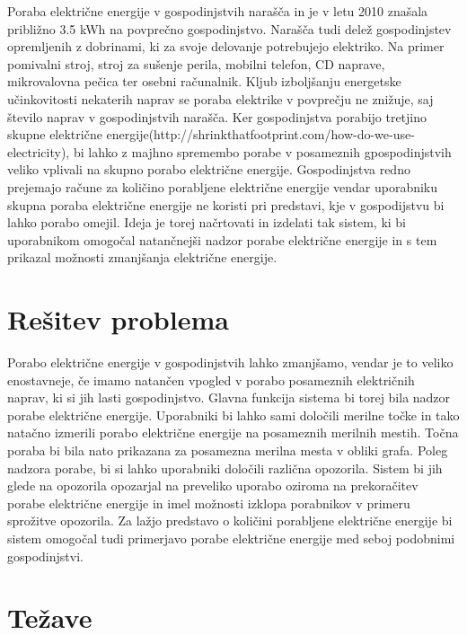 \documentclass[12pt,a4paper,titlepage,openany]{report}
\begin{document}
Poraba električne energije v gospodinjstvih narašča in je v letu 2010 znašala približno 3.5 kWh na povprečno gospodinjstvo. Narašča tudi delež gospodinjstev opremljenih z dobrinami, ki za svoje delovanje potrebujejo elektriko. Na primer pomivalni stroj, stroj za sušenje perila, mobilni telefon, CD naprave, mikrovalovna pečica ter osebni računalnik. Kljub izboljšanju energetske učinkovitosti nekaterih naprav se poraba elektrike v povprečju ne znižuje, saj število naprav v gospodinjstvih narašča. Ker gospodinjstva porabijo tretjino skupne električne energije(http://shrinkthatfootprint.com/how-do-we-use-electricity), bi lahko z majhno spremembo porabe v posameznih gpospodinjstvih veliko vplivali na skupno porabo električne energije. Gospodinjstva redno prejemajo račune za količino porabljene električne energije vendar uporabniku skupna poraba električne energije ne koristi pri predstavi, kje v gospodijstvu bi lahko porabo omejil. Ideja je torej načrtovati in izdelati tak sistem, ki bi uporabnikom omogočal natančnejši nadzor porabe električne energije in s tem prikazal možnosti zmanjšanja električne energije.

\section{Rešitev problema}
\thispagestyle{fancy}

Porabo električne energije v gospodinjstvih lahko zmanjšamo, vendar je to veliko enostavneje, če imamo natančen vpogled v porabo posameznih električnih naprav, ki si jih lasti gospodinjstvo. Glavna funkcija sistema bi torej bila nadzor porabe električne energije. Uporabniki bi lahko sami določili merilne točke in tako natačno izmerili porabo električne energije na posameznih merilnih mestih. Točna poraba bi bila nato prikazana za posamezna merilna mesta v obliki grafa. Poleg nadzora porabe, bi si lahko uporabniki določili različna opozorila. Sistem bi jih glede na opozorila opozarjal na preveliko uporabo oziroma na prekoračitev porabe električne energije in imel možnosti izklopa porabnikov v primeru sprožitve opozorila. Za lažjo predstavo o količini porabljene električne energije bi sistem omogočal tudi primerjavo porabe električne energije med seboj podobnimi gospodinjstvi.

\section{Težave}
\thispagestyle{fancy}
\end{document}
